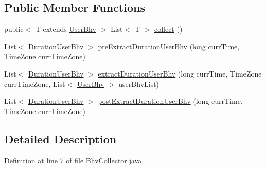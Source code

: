 \subsection*{\-Public \-Member \-Functions}
\begin{DoxyCompactItemize}
\item 
public$<$ \-T extends \hyperlink{interfacelab_1_1davidahn_1_1appshuttle_1_1collect_1_1bhv_1_1_user_bhv}{\-User\-Bhv} $>$\*
 \-List$<$ \-T $>$ \hyperlink{interfacelab_1_1davidahn_1_1appshuttle_1_1collect_1_1bhv_1_1_bhv_collector_a817cc0819ccc06eec91fd8ea51f2a660}{collect} ()
\item 
\-List$<$ \hyperlink{classlab_1_1davidahn_1_1appshuttle_1_1collect_1_1bhv_1_1_duration_user_bhv}{\-Duration\-User\-Bhv} $>$ \hyperlink{interfacelab_1_1davidahn_1_1appshuttle_1_1collect_1_1bhv_1_1_bhv_collector_aa14deace7c39af4f0587dae8689bd640}{pre\-Extract\-Duration\-User\-Bhv} (long curr\-Time, \-Time\-Zone curr\-Time\-Zone)
\item 
\-List$<$ \hyperlink{classlab_1_1davidahn_1_1appshuttle_1_1collect_1_1bhv_1_1_duration_user_bhv}{\-Duration\-User\-Bhv} $>$ \hyperlink{interfacelab_1_1davidahn_1_1appshuttle_1_1collect_1_1bhv_1_1_bhv_collector_a62223fc02f20dae19536502f0d49dd91}{extract\-Duration\-User\-Bhv} (long curr\-Time, \-Time\-Zone curr\-Time\-Zone, \-List$<$ \hyperlink{interfacelab_1_1davidahn_1_1appshuttle_1_1collect_1_1bhv_1_1_user_bhv}{\-User\-Bhv} $>$ user\-Bhv\-List)
\item 
\-List$<$ \hyperlink{classlab_1_1davidahn_1_1appshuttle_1_1collect_1_1bhv_1_1_duration_user_bhv}{\-Duration\-User\-Bhv} $>$ \hyperlink{interfacelab_1_1davidahn_1_1appshuttle_1_1collect_1_1bhv_1_1_bhv_collector_a1b1a845cd527902ba4420eb4be69ec89}{post\-Extract\-Duration\-User\-Bhv} (long curr\-Time, \-Time\-Zone curr\-Time\-Zone)
\end{DoxyCompactItemize}


\subsection{\-Detailed \-Description}


\-Definition at line 7 of file \-Bhv\-Collector.\-java.



